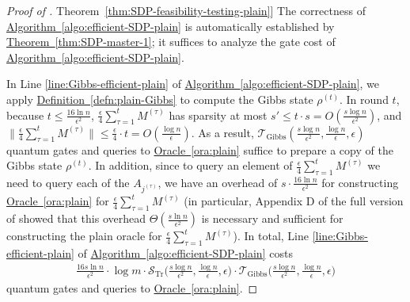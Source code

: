 \documentclass[a4paper,UKenglish,cleveref, autoref]{lipics-v2019}
\theoremstyle{remark}
\numberwithin{equation}{section}
\numberwithin{oracle}{section}
\numberwithin{remark}{section}
\newcommand{\ora}[1]{\hyperref[ora:#1]{Oracle~\ref*{ora:#1}}}
\newcommand{\thm}[1]{\hyperref[thm:#1]{Theorem~\ref*{thm:#1}}}
\newcommand{\defn}[1]{\hyperref[defn:#1]{Definition~\ref*{defn:#1}}}
\newcommand{\algo}[1]{\hyperref[algo:#1]{Algorithm~\ref*{algo:#1}}}
\DeclareMathOperator{\tr}{Tr}
\begin{document}
\begin{proof}[Proof of \thm{SDP-feasibility-testing-plain}]
The correctness of \algo{efficient-SDP-plain} is automatically established by \thm{SDP-master-1}; it suffices to analyze the gate cost of \algo{efficient-SDP-plain}.

In Line \ref{line:Gibbs-efficient-plain} of \algo{efficient-SDP-plain}, we apply \defn{plain-Gibbs} to compute the Gibbs state $\rho^{(t)}$. In round $t$, because $t\leq\frac{16\ln n}{\epsilon^{2}}$, $\frac{\epsilon}{4}\sum_{\tau=1}^{t}M^{(\tau)}$ has sparsity at most $s'\leq t\cdot s=O(\frac{s\log n}{\epsilon^{2}})$, and $\|\frac{\epsilon}{4}\sum_{\tau=1}^{t}M^{(\tau)}\|\leq \frac{\epsilon}{4}\cdot t=O(\frac{\log n}{\epsilon})$. As a result, $\mathcal{T}_{\text{Gibbs}}(\frac{s\log n}{\epsilon^{2}},\frac{\log n}{\epsilon},\epsilon)$ quantum gates and queries to \ora{plain} suffice to prepare a copy of the Gibbs state $\rho^{(t)}$. In addition, since to query an element of $\frac{\epsilon}{4}\sum_{\tau=1}^{t}M^{(\tau)}$ we need to query each of the $A_{j^{(\tau)}}$, we have an overhead of $s\cdot\frac{16\ln n}{\epsilon^{2}}$ for constructing \ora{plain} for $\frac{\epsilon}{4}\sum_{\tau=1}^{t}M^{(\tau)}$ (in particular, Appendix D of the full version of \cite{vanApeldoorn2017quantum} showed that this overhead $\Theta(\frac{s\ln n}{\epsilon^{2}})$ is necessary and sufficient for constructing the plain oracle for $\frac{\epsilon}{4}\sum_{\tau=1}^{t}M^{(\tau)}$). In total, Line \ref{line:Gibbs-efficient-plain} of \algo{efficient-SDP-plain} costs
\begin{align}
\frac{16s\ln n}{\epsilon^{2}}\cdot\log m\cdot\mathcal{S}_{\tr}\Big(\frac{s\log n}{\epsilon^{2}},\frac{\log n}{\epsilon},\epsilon\Big)\cdot \mathcal{T}_{\text{Gibbs}}\Big(\frac{s\log n}{\epsilon^{2}},\frac{\log n}{\epsilon},\epsilon\Big)
\end{align}
quantum gates and queries to \ora{plain}.


\end{proof}
\end{document}

